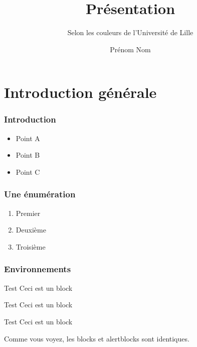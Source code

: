 \documentclass[svgnames,12pt,aspectratio=149]{beamer}
\author{Prénom Nom}
\title{Présentation}
\subtitle{Selon les couleurs de l'Université de Lille}
\begin{document}
\begin{frame}[plain]
  \titlepage
\end{frame}

\section{Introduction générale}
\begin{frame}
  \frametitle{Introduction}

  \begin{itemize}
  \item Point A
  \item Point B
  \item Point C
  \end{itemize}
\end{frame}

\begin{frame}
  \frametitle{Une énumération}

  \begin{enumerate}
  \item Premier
  \item Deuxième
  \item Troisième
  \end{enumerate}
\end{frame}

\begin{frame}
  \frametitle{Environnements}
  \begin{block}{Test}
    Ceci est un block
  \end{block}


  \begin{alertblock}{Test}
    Ceci est un block
  \end{alertblock}

  \begin{exampleblock}{Test}
    Ceci est un block
  \end{exampleblock}

  Comme vous voyez, les \alert{blocks} et \alert{alertblocks} sont identiques.
  
\end{frame}
\end{document}
